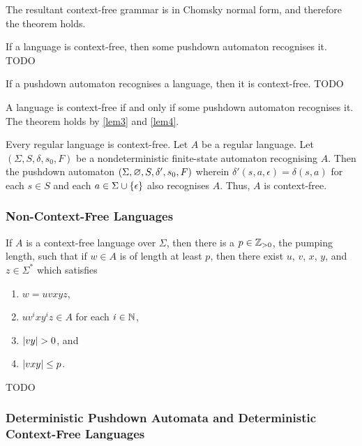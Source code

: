     The resultant context-free grammar is in Chomsky normal form, and therefore
    the theorem holds.
\Epr

\Blm
    \label{lem3}
    If a language is context-free, then some pushdown automaton recognises it.
\Elm
\Bpr
    TODO
\Epr

\Blm
    \label{lem4}
    If a pushdown automaton recognises a language, then it is context-free.
\Elm
\Bpr
    TODO
\Epr

\Bth
    A language is context-free if and only if some pushdown automaton recognises
    it.
\Eth
\Bpr
    The theorem holds by \autoref{lem3} and \autoref{lem4}.
\Epr

\Bcr
    Every regular language is context-free.
\Ecr
\Bpr
    Let \(A\) be a regular language. Let \((\Sigma, S, \delta, s_0, F)\) be a
    nondeterministic finite-state automaton recognising \(A\). Then the pushdown
    automaton \((\Sigma, \varnothing, S, \delta', s_0, F)\) wherein \(\delta'(s, a,
    \epsilon) = \delta(s, a)\) for each \(s \in S\) and each \(a \in \Sigma \cup
    \{\epsilon\}\) also recognises \(A\). Thus, \(A\) is context-free.
\Epr

\subsubsection{Non-Context-Free Languages}

    If \(A\) is a context-free language over \(\Sigma\), then there is a \(p \in
    \mathbb{Z}_{>0}\), the pumping length, such that if \(w \in A\) is of length at
    least \(p\), then there exist \(u\), \(v\), \(x\), \(y\), and \(z \in
    \Sigma^*\) which satisfies
    \begin{enumerate}
        \item \(w = u v x y z\),
        \item \(u v^i x y^i z \in A\) for each \(i \in \mathbb{N}\),
        \item \(\lvert v y\rvert > 0\), and
        \item \(\lvert v x y\rvert \leq p\).
    \end{enumerate}
\Eth
\Bpr
    TODO
\Epr

\subsubsection{Deterministic Pushdown Automata and Deterministic Context-Free
Languages}

\Edc
